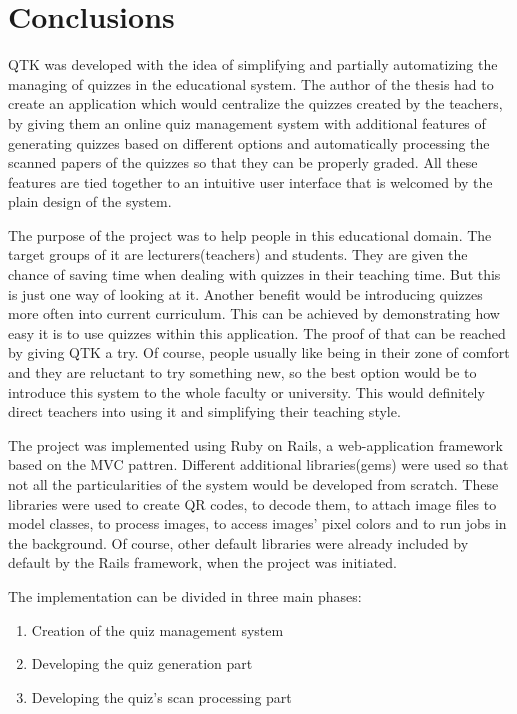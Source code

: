 \section*{Conclusions}


QTK was developed with the idea of simplifying and partially automatizing the managing of quizzes in the educational system. The author of the thesis had to create an application which would centralize the quizzes created by the teachers, by giving them an online quiz management system with additional features of generating quizzes based on different options and automatically processing the scanned papers of the quizzes so that they can be properly graded. All these features are tied together to an intuitive user interface that is welcomed by the plain design of the system. 

The purpose of the project was to help people in this educational domain. The target groups of it are lecturers(teachers) and students. They are given the chance of saving time when dealing with quizzes in their teaching time. But this is just one way of looking at it. Another benefit would be introducing quizzes more often into current curriculum. This can be achieved by demonstrating how easy it is to use quizzes within this application. The proof of that can be reached by giving QTK a try. Of course, people usually like being in their zone of comfort and they are reluctant to try something new, so the best option would be to introduce this system to the whole faculty or university. This would definitely direct teachers into using it and simplifying their teaching style. 

The project was implemented using Ruby on Rails, a web-application framework based on the MVC pattren. Different additional libraries(gems) were used so that not all the particularities of the system would be developed from scratch. These libraries were used to create QR codes, to decode them, to attach image files to model classes, to process images, to access images' pixel colors and to run jobs in the background. Of course, other default libraries were already included by default by the Rails framework, when the project was initiated. 

The implementation can be divided in three main phases:
\begin{enumerate}
  \item Creation of the quiz management system
  \item Developing the quiz generation part
  \item Developing the quiz's scan processing part
\end{enumerate}

